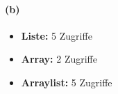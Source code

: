 \documentclass[a4paper]{article}
\begin{document}
\paragraph{(b)}
\begin{itemize}
    \item \textbf{Liste:} 5 Zugriffe
    \item \textbf{Array:} 2 Zugriffe
    \item \textbf{Arraylist:} 5 Zugriffe
\end{itemize}
\end{document}
